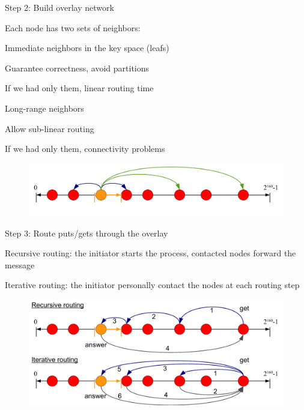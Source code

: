 \begin{frame}{Step 2: Build overlay network}

Each node has two sets of neighbors:
\BIL
\item Immediate neighbors in the key space (leafs)
  \BI
  \item Guarantee correctness, avoid partitions
  \item If we had only them, linear routing time
  \EI
\item Long-range neighbors
  \BI
  \item Allow sub-linear routing
  \item If we had only them, connectivity problems
  \EI
\EIL

\begin{figure}
	\includegraphics[width=\textwidth]{figs/10/dht-overlay}
\end{figure}

\end{frame}

\begin{frame}{Step 3: Route puts/gets through the overlay}

\BI
\item \alert{Recursive routing}: the initiator starts the process, contacted
  nodes forward the message	
\item \alert{Iterative routing}: the initiator personally contact the nodes at each
  routing step
\EI

\begin{figure}
	\includegraphics[width=\textwidth]{figs/10/dht-route}
\end{figure}

\end{frame}

